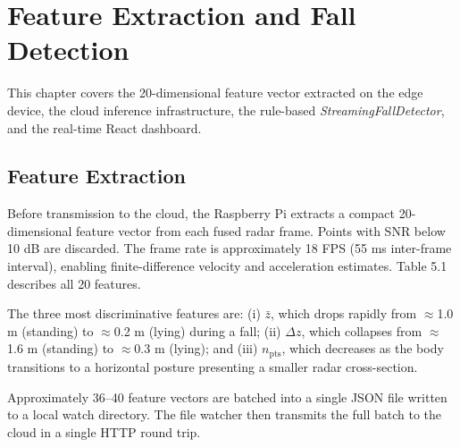 \chapter{Feature Extraction and Fall Detection}



This chapter covers the 20-dimensional feature vector extracted on the edge device, the cloud inference infrastructure, the rule-based \textit{StreamingFallDetector}, and the real-time React dashboard.

\section{Feature Extraction}

Before transmission to the cloud, the Raspberry Pi extracts a compact 20-dimensional feature vector from each fused radar frame. Points with SNR below 10 dB are discarded. The frame rate is approximately 18 FPS (55 ms inter-frame interval), enabling finite-difference velocity and acceleration estimates. Table 5.1 describes all 20 features.

The three most discriminative features are: (i) $\bar{z}$, which drops rapidly from $\approx$1.0 m (standing) to $\approx$0.2 m (lying) during a fall; (ii) $\Delta z$, which collapses from $\approx$1.6 m (standing) to $\approx$0.3 m (lying); and (iii) $n_{\text{pts}}$, which decreases as the body transitions to a horizontal posture presenting a smaller radar cross-section.

Approximately 36--40 feature vectors are batched into a single JSON file written to a local watch directory. The file watcher then transmits the full batch to the cloud in a single HTTP round trip.


